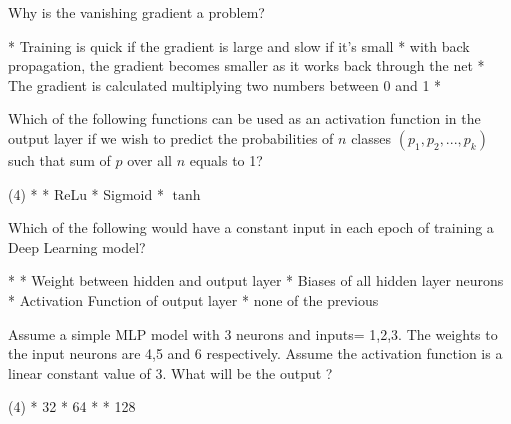 \documentclass[10pt]{extarticle}
\begin{document}
\begin{exercise}
    Why is the vanishing gradient a problem?
    \begin{choice}
        * Training is quick if the gradient is large and slow if it's small
        * with back propagation, the gradient becomes smaller as it works back through the net
        * The gradient is calculated multiplying two numbers between 0 and 1
        * 
    \end{choice}
\end{exercise}
\begin{solution}
\end{solution}

\begin{exercise}
    Which of the following functions can be used as an activation function in the output layer if we wish to predict the probabilities of \(n\) classes \((p_1,p_2,...,p_k)\) such that sum of \(p\) over all \(n\) equals to 1?
    \begin{choice} (4)
        * 
        * ReLu
        * Sigmoid
        * \(\tanh\)
    \end{choice}
\end{exercise}
\begin{solution}
\end{solution}

\begin{exercise}
    Which of the following would have a constant input in each epoch of training a Deep Learning model?
    \begin{choice}
        * 
        * Weight between hidden and output layer
        * Biases of all hidden layer neurons
        * Activation Function of output layer
        * none of the previous
    \end{choice}
\end{exercise}
\begin{solution}
\end{solution}

\begin{exercise}
    Assume a simple MLP model with 3 neurons and inputs= 1,2,3. The weights to the input neurons are 4,5 and 6 respectively. Assume the activation function is a linear constant value of 3. What will be the output ?
    \begin{choice} (4)
        * 32
        * 64
        * 
        * 128
    \end{choice}
\end{exercise}
\begin{solution}
\end{solution}
\end{document}
